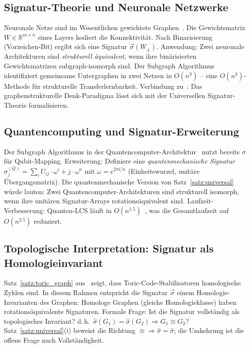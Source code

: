 ﻿\documentclass[a4paper,12pt]{article}
\theoremstyle{definition}
\begin{document}
\subsection{Signatur-Theorie und Neuronale Netzwerke}

Neuronale Netze sind im Wesentlichen gewichtete Graphen~\cite{epp2026nngraphs}.
Die Gewichtsmatrix $W \in \mathbb{R}^{m\times n}$ eines Layers kodiert die
Konnektivit\"at. Nach Binarisierung (Vorzeichen-Bit) ergibt sich eine
Signatur $\vec{\sigma}(W_{\pm})$.
Anwendung: Zwei neuronale Architekturen sind \emph{strukturell \"aquivalent},
wenn ihre bin\"arisierten Gewichtsmatrizen subgraph-isomorph sind.
Der Subgraph Algorithmus identifiziert gemeinsame Untergraphen in zwei Netzen
in $O(n^3)$ -- eine $O(n^3)$-Methode f\"ur strukturelle Transferlernbarkeit.
Verbindung zu~\cite{epp2026graphdenk}: Das graphenstrukturelle Denk-Paradigma
l\"asst sich mit der Universellen Signatur-Theorie formalisieren.

\subsection{Quantencomputing und Signatur-Erweiterung}

Der Subgraph Algorithmus in der Quantencomputer-Architektur~\cite{epp2026qsubgraph}
nutzt bereits $\sigma$ f\"ur Qubit-Mapping.
Erweiterung: Definiere eine \emph{quantenmechanische Signatur}
$\sigma_j^{(Q)} = \sum_{i} U_{ij} \cdot \omega^i + j \cdot \omega^n$
mit $\omega = e^{2\pi i/n}$ (Einheitswurzel, unit\"are \"Ubergangsmatrix).
Die quantenmechanische Version von Satz~\ref{satz:universal} w\"urde lauten:
Zwei Quantencomputer-Architekturen sind strukturell isomorph, wenn ihre
unit\"aren Signatur-Arrays rotations\"aquivalent sind.
Laufzeit-Verbesserung: Quanten-LCS l\"auft in $O(n^{1.5})$~\cite{epp2026qecc},
was die Gesamtlaufzeit auf $O(n^{2.5})$ reduziert.

\subsection{Topologische Interpretation: Signatur als Homologieinvariant}

Satz~\ref{satz:toric_graph} aus~\cite{epp2026qecc} zeigt, dass
Toric-Code-Stabilisatoren homologische Zyklen sind. In diesem Rahmen
entspricht die Signatur $\vec{\sigma}$ einem Homologie-Invarianten
des Graphen: Homologe Graphen (gleiche Homologieklasse) haben
rotations\"aquivalente Signaturen.
Formale Frage: Ist die Signatur vollst\"andig als topologisches Invariant?
d.\,h.\ $\hat{\sigma}(G_1) = \hat{\sigma}(G_2) \Rightarrow G_1 \cong G_2$?
Satz~\ref{satz:universal}(i) beweist die Richtung $\cong \Rightarrow \hat{\sigma}=\hat{\sigma}$;
die Umkehrung ist die offene Frage nach Vollst\"andigkeit.
\end{document}
